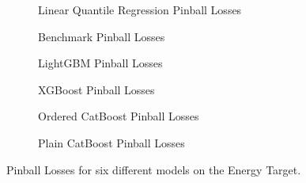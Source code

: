\begin{figure}[htbp]
    \centering
    \begin{subfigure}[b]{0.5\textwidth}
        \centering
        
        \caption{Linear Quantile Regression Pinball Losses}
        \label{fig:small-orfe-pinball-energy}
    \end{subfigure}%
    \begin{subfigure}[b]{0.5\textwidth}
        \centering
        
        \caption{Benchmark Pinball Losses}
        \label{fig:armed-play-pinball-energy}
    \end{subfigure}
    
    \begin{subfigure}[b]{0.5\textwidth}
        \centering
        
        \caption{LightGBM Pinball Losses}
        \label{fig:mangy-flux-pinball-energy}
    \end{subfigure}%
    \begin{subfigure}[b]{0.5\textwidth}
        \centering
        
        \caption{XGBoost Pinball Losses}
        \label{fig:couth-ruby-pinball-energy}
    \end{subfigure}
    
    \begin{subfigure}[b]{0.5\textwidth}
        \centering
        
        \caption{Ordered CatBoost Pinball Losses}
        \label{fig:civil-leas-pinball-energy}
    \end{subfigure}%
    \begin{subfigure}[b]{0.5\textwidth}
        \centering
        
        \caption{Plain CatBoost Pinball Losses}
        \label{fig:blear-dita-pinball-energy}
    \end{subfigure}
    
    \caption{Pinball Losses for six different models on the Energy Target.}
    \label{fig:energy_pinball}
\end{figure}

